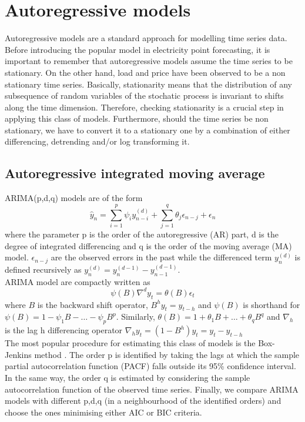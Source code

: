 \section{Autoregressive models}
Autoregressive models are a standard approach for modelling time series data.
Before introducing the popular model in electricity point forecasting, it is important to remember that autoregressive models assume the time series to be stationary. On the other hand, load and price have been observed to be a non stationary time series. 
Basically, stationarity means that the distribution of any subsequence of random variables of the stochatic process is invariant to shifts along the time dimension.
Therefore, checking stationarity is a crucial step in applying this class of models. %
Furthermore, should the time series be non stationary, we have to convert it to a stationary one by a combination of either differencing, detrending and/or log transforming it.
\subsection{Autoregressive integrated moving average}
ARIMA(p,d,q) models are of the form
\begin{equation}
    \hat{y}_n=\sum\limits_{i=1}^{p}\psi_i y_{n-i}^{(d)}+\sum\limits_{j=1}^{q}\theta_j \epsilon_{n-j}+\epsilon_n
\end{equation}
where the parameter p is the order of the autoregressive (AR) part, d is the degree of integrated differencing and q is the order of the moving average (MA) model. $\epsilon_{n-j}$ are the observed errors in the past while the differenced term $y_n^{(d)}$ is defined recursively as $y_n^{(d)}=y_n^{(d-1)}-y_{n-1}^{(d-1)}$.
\\
ARIMA model are compactly written as
\begin{equation}
    \psi(B)\nabla^d y_t=\theta(B)\epsilon_t
\end{equation}
where $B$ is the backward shift operator, $B^h y_t=y_{t-h}$ and $\psi(B)$ is shorthand for $\psi(B)=1-\psi_1B-\dots-\psi_p B^p$.
Similarly, $\theta(B)=1+\theta_1B+\dots+\theta_q B^q$ and $\nabla_h$ is the lag h differencing operator $\nabla_h y_t=(1-B^h)y_t=y_t-y_{t-h}$
\\
The most popular procedure for estimating this class of models is the Box-Jenkins method \cite{box2015time}.
The order p is identified by taking the lags at which the sample partial autocorrelation function (PACF) falls outside its 95\% confidence interval.
In the same way, the order q is estimated by considering the sample autocorrelation function of the observed time series. Finally, we compare ARIMA models with different p,d,q (in a neighbourhood of the identified orders) and choose the ones minimising either AIC or BIC criteria. 


